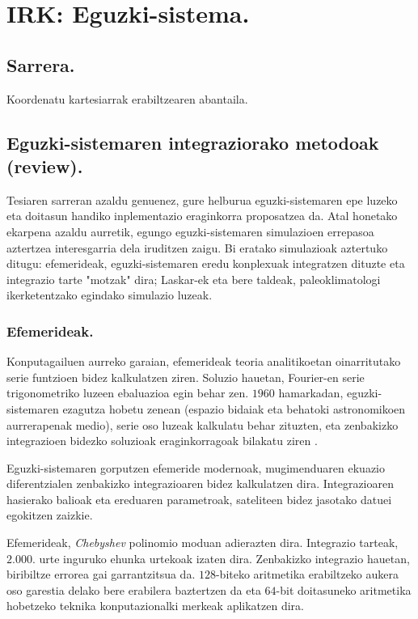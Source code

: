 \chapter{IRK: Eguzki-sistema.}

\section{Sarrera.}

Koordenatu kartesiarrak erabiltzearen abantaila.

\section{Eguzki-sistemaren integraziorako metodoak (review).}


Tesiaren sarreran azaldu genuenez, gure helburua eguzki-sistemaren epe luzeko eta doitasun handiko inplementazio eraginkorra proposatzea da. Atal honetako ekarpena azaldu aurretik, egungo eguzki-sistemaren simulazioen errepasoa aztertzea interesgarria dela iruditzen zaigu. Bi eratako simulazioak aztertuko ditugu: efemerideak, eguzki-sistemaren eredu konplexuak integratzen dituzte eta integrazio tarte "motzak" dira; Laskar-ek eta bere taldeak, paleoklimatologi ikerketentzako egindako simulazio luzeak.  

\subsection{Efemerideak.}

Konputagailuen aurreko garaian, efemerideak teoria analitikoetan oinarritutako serie funtzioen bidez kalkulatzen ziren. Soluzio hauetan, Fourier-en serie trigonometriko luzeen ebaluazioa egin behar zen. $1960$ hamarkadan, eguzki-sistemaren ezagutza hobetu zenean (espazio bidaiak eta behatoki astronomikoen aurrerapenak medio), serie oso luzeak kalkulatu behar zituzten, eta zenbakizko integrazioen bidezko soluzioak eraginkorragoak bilakatu ziren \cite{Kaplan2015}.   
   
Eguzki-sistemaren gorputzen efemeride modernoak, mugimenduaren ekuazio diferentzialen zenbakizko integrazioaren bidez kalkulatzen dira. Integrazioaren hasierako balioak eta ereduaren parametroak, sateliteen bidez jasotako datuei egokitzen zaizkie.

Efemerideak, \emph{Chebyshev} polinomio moduan adierazten dira. Integrazio tarteak, $2.000.$ urte inguruko ehunka urtekoak izaten dira. Zenbakizko integrazio hauetan, biribiltze errorea gai garrantzitsua da. $128$-biteko aritmetika erabiltzeko aukera oso garestia delako bere erabilera baztertzen da eta $64$-bit doitasuneko aritmetika hobetzeko teknika konputazionalki merkeak aplikatzen dira. 

